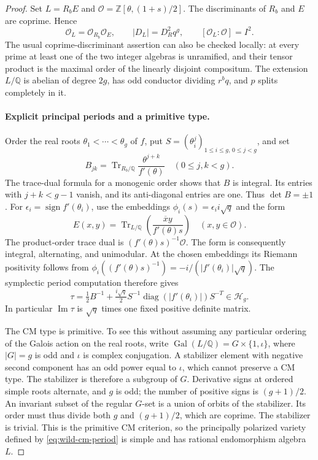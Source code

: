 \documentclass[11pt]{article}
\theoremstyle{definition}
\theoremstyle{remark}
\begin{document}
\begin{proof}
Set \(L=R_bE\) and
\(\mathcal O=\mathbb Z[\theta,(1+s)/2]\).
The discriminants of \(R_b\) and \(E\) are coprime. Hence
\begin{equation}
 \mathcal O_L=\mathcal O_{R_b}\mathcal O_E,\qquad
 |D_L|=D_R^2q^g,\qquad [\mathcal O_L:\mathcal O]=I^2.
 \label{eq:wild-cm-order}
\end{equation}
The usual coprime-discriminant assertion can also be checked
locally: at every prime at least one of the two integer algebras
is unramified, and their tensor product is the maximal order of
the linearly disjoint compositum. The extension \(L/\mathbb Q\)
is abelian of degree \(2g\), has odd conductor dividing
\(r^bq\), and \(p\) splits completely in it.

\paragraph{Explicit principal periods and a primitive type.}
Order the real roots \(\theta_1<\cdots<\theta_g\) of \(f\),
put \(S=(\theta_i^j)_{1\leq i\leq g,\,0\leq j<g}\), and set
\[
 B_{jk}=\operatorname{Tr}_{R_b/\mathbb Q}
             \frac{\theta^{j+k}}{f'(\theta)}
 \quad(0\leq j,k<g).
\]
The trace-dual formula for a monogenic order shows that \(B\)
is integral. Its entries with \(j+k<g-1\) vanish, and its
anti-diagonal entries are one. Thus \(\det B=\pm1\).
For \(\epsilon_i=\operatorname{sign}f'(\theta_i)\), use the
embeddings \(\phi_i(s)=\epsilon_i i\sqrt q\) and the form
\[
 E(x,y)=\operatorname{Tr}_{L/\mathbb Q}
       \left(\frac{\overline x y}{f'(\theta)s}\right)
                  \quad(x,y\in\mathcal O).
\]
The product-order trace dual is
\((f'(\theta)s)^{-1}\mathcal O\). The form is consequently
integral, alternating, and unimodular. At the chosen embeddings
its Riemann positivity follows from
\(\phi_i((f'(\theta)s)^{-1})=-i/(|f'(\theta_i)|\sqrt q)\).
The symplectic period computation therefore gives
\begin{equation}
 \tau=\tfrac12B^{-1}
       +\tfrac{i\sqrt q}{2}
          S^{-1}\operatorname{diag}(|f'(\theta_i)|)S^{-T}
                    \in\mathcal H_g.
 \label{eq:wild-cm-period}
\end{equation}
In particular \(\operatorname{Im}\tau\) is \(\sqrt q\) times
one fixed positive definite matrix.

The CM type is primitive. To see this without assuming any
particular ordering of the Galois action on the real roots,
write \(\operatorname{Gal}(L/\mathbb Q)=G\times\{1,\iota\}\),
where \(|G|=g\) is odd and \(\iota\) is complex conjugation.
A stabilizer element with negative second component has an odd
power equal to \(\iota\), which cannot preserve a CM type.
The stabilizer is therefore a subgroup of \(G\).
Derivative signs at ordered simple roots alternate, and \(g\)
is odd; the number of positive signs is \((g+1)/2\).
An invariant subset of the regular \(G\)-set is a union of
orbits of the stabilizer. Its order must thus divide both
\(g\) and \((g+1)/2\), which are coprime. The stabilizer is
trivial. This is the primitive CM criterion, so the principally
polarized variety defined by \eqref{eq:wild-cm-period} is simple and has rational
endomorphism algebra \(L\).


\end{proof}
\end{document}
